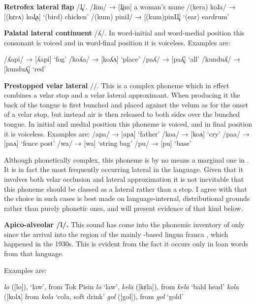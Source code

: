 \documentclass[output=paper]{langsci/langscibook}
\begin{document}
\vspace{5mm}
\noindent
\textbf{Retrofex lateral flap}  /ɺ̢/.
\ea
\ea
/ɺim/           →   [ɺ̢im] a woman’s name
\ex
/(kera) koɺa/   → [(k{ɛ}r{ʌ}) koɺ̢{ʌ}] ‘(bird) chicken’
\ex
/(kum) piniɺ/  → [(kum)pinIɺ̢] ‘(ear) eardrum’
\z
\z

\noindent
\textbf{Palatal lateral continuent} /ʎ/. In word-initial and word-medial position this consonant is voiced and in word-final position it is voiceless. Examples are: 

\ea
\ea
/{ʎ}api/        →  [{ʎ}api] ‘fog’
\ex
/ko{ʎ}a/       →  [ko{ʎ}{ʌ}] ‘place’
\ex
/pa{ʎ}/       →  [pa{ʎ̥}]  ‘all’
\ex
/kundu{ʎ}/  →  [kundu{ʎ̥}] ‘red’
\z
\z

\noindent
\textbf{Prestopped velar lateral} /{\gL}/. This is a complex phoneme which in effect combines a velar stop and a velar lateral approximant. When producing it the back of the tongue is first bunched and placed against the velum as for the onset of a velar stop, but instead air is then released to both sides over the bunched tongue. In initial and medial position this phoneme is voiced, and in final position it is voiceless. Examples are:
\ea
\ea
/{\gL}apa/    →  [{\gL}ap{ʌ}] ‘father’
\ex
/ko{\gL}a/   →  [ko{\gL}{ʌ}] ‘cry’
\ex
/pa{\gL}a/    →  [pa{\gL}{ʌ}]  ‘fence post’
\ex
/wa{\gL}/    →  [wa{\kL}]  ‘string bag’
\ex
/pu{\gL}/    →  [pu{\kL}]   ‘base’
\z
\z

Although phonetically complex, this phoneme is by no means a marginal one in . It is in fact the most frequently occurring lateral in the language. Given that it involves both velar occlusion and lateral approximation it is not inevitable that this phoneme should be classed as a lateral rather than a stop. I agree with \citet{François2010} that the choice in such cases is best made on language-internal, distributional grounds rather than purely phonetic ones, and will pre\-sent evidence of that kind below.
\vspace{5mm}

 \noindent
\textbf{Apico-alveolar /l/.} This sound has come into the phonemic inventory of  only since the arrival into the region of the mainly -based lingua franca , which happened in the 1930s. This is evident from the fact it occurs only in loan words from that language. 

Examples are:

\ea
\ea
\textit{lo} ([lo]), ‘law’, from Tok  Pisin \textit{lo} ‘law’, 
\ex
\textit{kela} ([k{ɛ}la]), from  \textit{kela} ‘bald head’
\ex
\textit{kola} ([kol{ʌ}] from  \textit{kola} ‘cola, soft drink’
\ex
\textit{gol} ([gol]), from  \textit{gol} ‘gold’  
\z
\z
\end{document}
